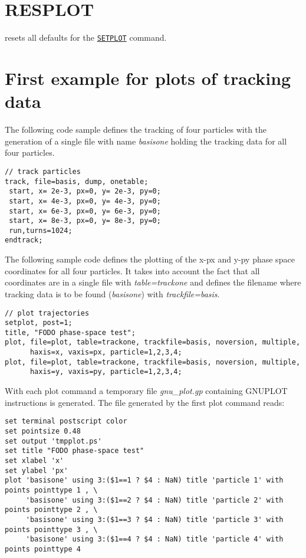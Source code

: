 \section{RESPLOT}
\label{sec:resplot}
resets all defaults for the \hyperref[sec:setplot]{\tt SETPLOT} command.  


\section{First example for plots of tracking data}
\label{sec:plot_example_1}

The following \madx code sample defines the tracking of four particles 
with the generation of a single file with name \textit{basisone} 
holding the tracking data for all four particles.  

\begin{verbatim}
// track particles
track, file=basis, dump, onetable;
 start, x= 2e-3, px=0, y= 2e-3, py=0;
 start, x= 4e-3, px=0, y= 4e-3, py=0;
 start, x= 6e-3, px=0, y= 6e-3, py=0;
 start, x= 8e-3, px=0, y= 8e-3, py=0;
 run,turns=1024;
endtrack;
\end{verbatim}

The following sample code defines the plotting of the x-px and y-py
phase space coordinates for all four particles. 
It takes into account the fact that all coordinates are in a single file 
with \textit{table=trackone} and defines the filename where tracking data 
is to be found (\textit{basisone}) with \textit{trackfile=basis}. 

\begin{verbatim}
// plot trajectories
setplot, post=1; 
title, "FODO phase-space test";
plot, file=plot, table=trackone, trackfile=basis, noversion, multiple, 
      haxis=x, vaxis=px, particle=1,2,3,4; 
plot, file=plot, table=trackone, trackfile=basis, noversion, multiple, 
      haxis=y, vaxis=py, particle=1,2,3,4;
\end{verbatim}

With each plot command a temporary file \textit{gnu\_plot.gp} containing
GNUPLOT instructions is generated.  
The file generated by the first plot command reads: 

{\footnotesize \begin{verbatim}  
set terminal postscript color
set pointsize 0.48
set output 'tmpplot.ps'
set title "FODO phase-space test"
set xlabel 'x'
set ylabel 'px'
plot 'basisone' using 3:($1==1 ? $4 : NaN) title 'particle 1' with points pointtype 1 , \
     'basisone' using 3:($1==2 ? $4 : NaN) title 'particle 2' with points pointtype 2 , \
     'basisone' using 3:($1==3 ? $4 : NaN) title 'particle 3' with points pointtype 3 , \
     'basisone' using 3:($1==4 ? $4 : NaN) title 'particle 4' with points pointtype 4 
\end{verbatim}}

